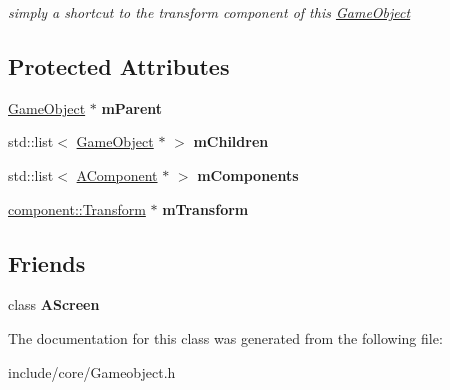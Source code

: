 \begin{DoxyCompactItemize}
\begin{DoxyCompactList}\small\item\em simply a shortcut to the transform component of this \hyperlink{classde_1_1_game_object}{\-Game\-Object} \end{DoxyCompactList}\end{DoxyCompactItemize}
\subsection*{\-Protected \-Attributes}
\begin{DoxyCompactItemize}
\item 
\hypertarget{classde_1_1_game_object_a946fc91be8a39c450f985d8852f3ed02}{
\hyperlink{classde_1_1_game_object}{\-Game\-Object} $\ast$ {\bfseries m\-Parent}}
\label{classde_1_1_game_object_a946fc91be8a39c450f985d8852f3ed02}

\item 
\hypertarget{classde_1_1_game_object_a1faf0cb425332b0d252dad8082089fd8}{
std\-::list$<$ \hyperlink{classde_1_1_game_object}{\-Game\-Object} $\ast$ $>$ {\bfseries m\-Children}}
\label{classde_1_1_game_object_a1faf0cb425332b0d252dad8082089fd8}

\item 
\hypertarget{classde_1_1_game_object_a1d5028e8aef6e3643d834fdfc555db61}{
std\-::list$<$ \hyperlink{classde_1_1_a_component}{\-A\-Component} $\ast$ $>$ {\bfseries m\-Components}}
\label{classde_1_1_game_object_a1d5028e8aef6e3643d834fdfc555db61}

\item 
\hypertarget{classde_1_1_game_object_a4e0cccd0d009116e04fd92cc3d746a33}{
\hyperlink{classde_1_1component_1_1_transform}{component\-::\-Transform} $\ast$ {\bfseries m\-Transform}}
\label{classde_1_1_game_object_a4e0cccd0d009116e04fd92cc3d746a33}

\end{DoxyCompactItemize}
\subsection*{\-Friends}
\begin{DoxyCompactItemize}
\item 
\hypertarget{classde_1_1_game_object_ae1b9dd8d05ef01c165957ca5bbf66e72}{
class {\bfseries \-A\-Screen}}
\label{classde_1_1_game_object_ae1b9dd8d05ef01c165957ca5bbf66e72}

\end{DoxyCompactItemize}


\-The documentation for this class was generated from the following file\-:\begin{DoxyCompactItemize}
\item 
include/core/\-Gameobject.\-h\end{DoxyCompactItemize}
